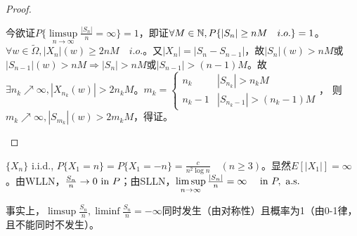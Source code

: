 \documentclass{ctexbook}
\begin{document}
\begin{proof}
\begin{enumerate}
    今欲证$P\{\limsup\limits_{n\to\infty}\frac{|S_{n}|}{n}=\infty\}=1$，即证$\forall M\in\mathbb{N}, P\{|S_{n}|\geq nM\quad i.o.\}=1$。$\forall w\in\tilde\Omega, |X_{n}|(w)\geq 2nM\quad i.o.$。又$|X_{n}|=|S_{n}-S_{n-1}|$，故$|S_{n}|(w)>nM$或$|S_{n-1}|(w)>nM\Rightarrow |S_{n}|>nM$或$|S_{n-1}|>(n-1)M$。故$\exists n_{k}\nearrow \infty, |X_{n_{k}}(w)|>2n_{k}M$。$m_{k}=
    \begin{cases}
      n_{k}& |S_{n_{k}}|>n_{k}M\\ n_{k}-1 & |S_{n_{k}-1}|>(n_{k}-1)M
    \end{cases}
  $，
  则$m_{k}\nearrow \infty, |S_{m_{k}}|(w)>2m_{k}M$，得证。


  \end{enumerate}
  \end{proof}

\begin{Eg}[WLLN]
  $\{X_{n}\}$ i.i.d., $P\{X_{1}=n\}=P\{X_{1}=-n\}=\frac{c}{n^{2}\log n}\quad(n\geq 3)$。显然$E[|X_{1}|]=\infty$。由WLLN，$\frac{S_{n}}{n}\to 0\text{ in } P$；由SLLN，$\limsup\limits_{n\to\infty}\frac{|S_{n}|}{n}=\infty\quad \text{ in } P,\text{ a.s. }$

  事实上，$\limsup \frac{S_{n}}{n}, \liminf \frac{S_{n}}{n}=-\infty$同时发生（由对称性）且概率为1（由0-1律，且不能同时不发生）。
\end{Eg}
\end{document}
